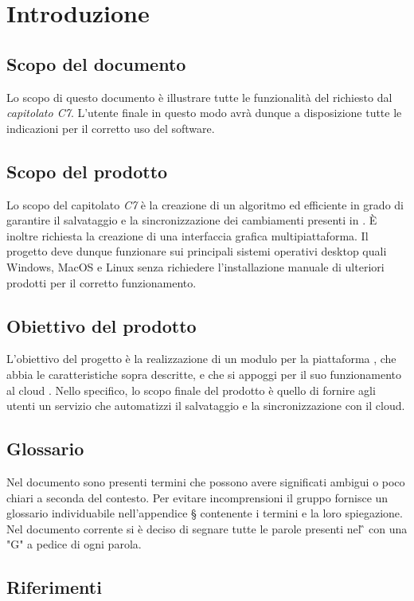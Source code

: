 \section{Introduzione}
\subsection{Scopo del documento}
Lo scopo di questo documento è illustrare tutte le funzionalità del  richiesto dal \textit{capitolato C7}. L'utente finale in questo modo avrà dunque a disposizione tutte le indicazioni per il corretto uso del software.

\subsection{Scopo del prodotto}
Lo scopo del capitolato \textit{C7} è la creazione di un algoritmo  ed efficiente in grado di garantire il salvataggio e la sincronizzazione dei cambiamenti presenti in . È inoltre richiesta la creazione di una interfaccia grafica multipiattaforma. Il progetto deve dunque funzionare sui principali sistemi operativi desktop quali Windows, MacOS e Linux senza richiedere l'installazione manuale di ulteriori prodotti per il corretto funzionamento. 
\subsection{Obiettivo del prodotto}
L'obiettivo del progetto è la realizzazione di un modulo per la piattaforma , che abbia le caratteristiche sopra descritte, e che si appoggi per il suo funzionamento al cloud .
Nello specifico, lo scopo finale del prodotto è quello di fornire agli utenti un servizio che automatizzi il salvataggio e la sincronizzazione con il cloud.

\subsection{Glossario}
Nel documento sono presenti termini che possono avere significati ambigui o poco chiari a seconda del contesto. Per evitare incomprensioni il gruppo fornisce un glossario individuabile nell'appendice \S{} contenente i termini e la loro spiegazione.\newline{}
Nel documento corrente si è deciso di segnare tutte le parole presenti nel \G{} con una "G" a pedice di ogni parola.
\subsection{Riferimenti}
